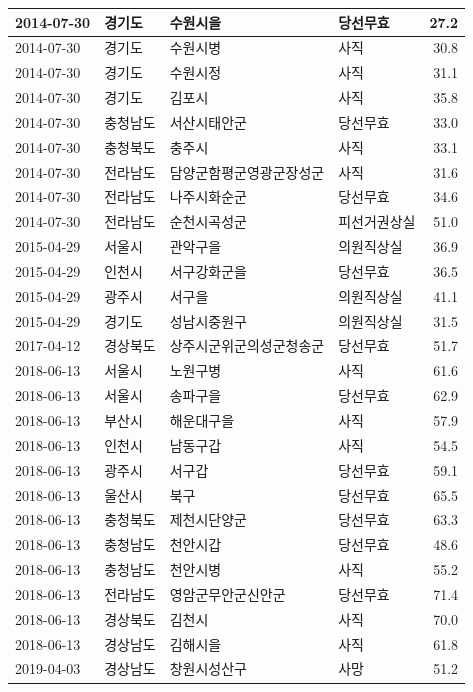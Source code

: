 \documentclass[
  11pt,
  letter]{article}
\begin{document}
\begin{longtable}[t]{l|l|l|l|r}
\hline
2014-07-30 & 경기도 & 수원시을 & 당선무효 & 27.2\\
\hline
2014-07-30 & 경기도 & 수원시병 & 사직 & 30.8\\
\hline
2014-07-30 & 경기도 & 수원시정 & 사직 & 31.1\\
\hline
2014-07-30 & 경기도 & 김포시 & 사직 & 35.8\\
\hline
2014-07-30 & 충청남도 & 서산시태안군 & 당선무효 & 33.0\\
\hline
2014-07-30 & 충청북도 & 충주시 & 사직 & 33.1\\
\hline
2014-07-30 & 전라남도 & 담양군함평군영광군장성군 & 사직 & 31.6\\
\hline
2014-07-30 & 전라남도 & 나주시화순군 & 당선무효 & 34.6\\
\hline
2014-07-30 & 전라남도 & 순천시곡성군 & 피선거권상실 & 51.0\\
\hline
2015-04-29 & 서울시 & 관악구을 & 의원직상실 & 36.9\\
\hline
2015-04-29 & 인천시 & 서구강화군을 & 당선무효 & 36.5\\
\hline
2015-04-29 & 광주시 & 서구을 & 의원직상실 & 41.1\\
\hline
2015-04-29 & 경기도 & 성남시중원구 & 의원직상실 & 31.5\\
\hline
2017-04-12 & 경상북도 & 상주시군위군의성군청송군 & 당선무효 & 51.7\\
\hline
2018-06-13 & 서울시 & 노원구병 & 사직 & 61.6\\
\hline
2018-06-13 & 서울시 & 송파구을 & 당선무효 & 62.9\\
\hline
2018-06-13 & 부산시 & 해운대구을 & 사직 & 57.9\\
\hline
2018-06-13 & 인천시 & 남동구갑 & 사직 & 54.5\\
\hline
2018-06-13 & 광주시 & 서구갑 & 당선무효 & 59.1\\
\hline
2018-06-13 & 울산시 & 북구 & 당선무효 & 65.5\\
\hline
2018-06-13 & 충청북도 & 제천시단양군 & 당선무효 & 63.3\\
\hline
2018-06-13 & 충청남도 & 천안시갑 & 당선무효 & 48.6\\
\hline
2018-06-13 & 충청남도 & 천안시병 & 사직 & 55.2\\
\hline
2018-06-13 & 전라남도 & 영암군무안군신안군 & 당선무효 & 71.4\\
\hline
2018-06-13 & 경상북도 & 김천시 & 사직 & 70.0\\
\hline
2018-06-13 & 경상남도 & 김해시을 & 사직 & 61.8\\
\hline
2019-04-03 & 경상남도 & 창원시성산구 & 사망 & 51.2\\

\end{longtable}
\end{document}

